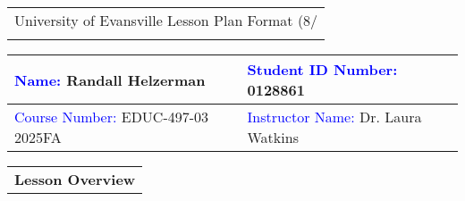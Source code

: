 \begin{tabularx}{\textwidth}{Y}
  {\large University of Evansville Lesson Plan Format (8/} \\
   \hline \\
\end{tabularx}


\begin{tabularx}{\textwidth}{|X|X|}
  \hline 
  \textcolor{blue}{Name:} Randall Helzerman           &   \textcolor{blue}{Student ID Number:} 0128861 \\
  \hline 
  \textcolor{blue}{Course Number:} EDUC-497-03 2025FA &   \textcolor{blue}{Instructor Name:} Dr. Laura Watkins\\
  \hline 
\end{tabularx}

\vskip 10pt

\begin{tabularx}{\textwidth}{Y}
  {\bf Lesson Overview} \\
\end{tabularx}


